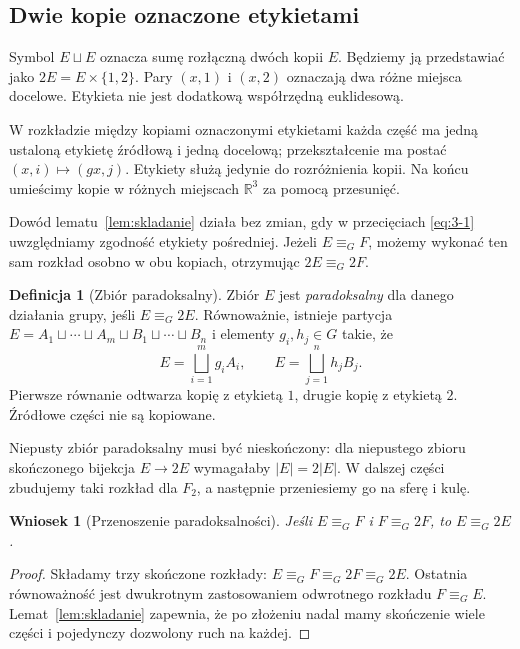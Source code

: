 \documentclass[11pt,a4paper]{article}
\numberwithin{equation}{section}
\theoremstyle{plain}
\newtheorem{wniosek}[twierdzenie]{Wniosek}
\theoremstyle{definition}
\newtheorem{definicja}[twierdzenie]{Definicja}
\theoremstyle{remark}
\newcommand{\R}{\mathbb R}
\newcommand{\equivG}{\mathrel{\equiv_G}}
\begin{document}
\subsection{Dwie kopie oznaczone etykietami}
Symbol $E\sqcup E$ oznacza sumę rozłączną dwóch kopii $E$. Będziemy ją przedstawiać jako $2E=E\times\{1,2\}$. Pary $(x,1)$ i $(x,2)$ oznaczają dwa różne miejsca docelowe. Etykieta nie jest dodatkową współrzędną euklidesową.

W rozkładzie między kopiami oznaczonymi etykietami każda część ma jedną ustaloną etykietę źródłową i jedną docelową; przekształcenie ma postać $(x,i)\mapsto(gx,j)$. Etykiety służą jedynie do rozróżnienia kopii. Na końcu umieścimy kopie w różnych miejscach $\R^3$ za pomocą przesunięć.

Dowód lematu~\ref{lem:skladanie} działa bez zmian, gdy w przecięciach \eqref{eq:3-1} uwzględniamy zgodność etykiety pośredniej. Jeżeli $E\equivG F$, możemy wykonać ten sam rozkład osobno w obu kopiach, otrzymując $2E\equivG2F$.
\begin{definicja}[Zbiór paradoksalny]\label{def:paradoksalny}
Zbiór $E$ jest \emph{paradoksalny} dla danego działania grupy, jeśli $E\equivG2E$. Równoważnie, istnieje partycja $E=A_1\sqcup\cdots\sqcup A_m\sqcup B_1\sqcup\cdots\sqcup B_n$ i elementy $g_i,h_j\in G$ takie, że
\[
 E=\bigsqcup_{i=1}^{m}g_iA_i,\qquad E=\bigsqcup_{j=1}^{n}h_jB_j.
\]
Pierwsze równanie odtwarza kopię z etykietą $1$, drugie kopię z etykietą $2$. Źródłowe części nie są kopiowane.
\end{definicja}
Niepusty zbiór paradoksalny musi być nieskończony: dla niepustego zbioru skończonego bijekcja $E\to2E$ wymagałaby $|E|=2|E|$. W dalszej części zbudujemy taki rozkład dla $F_2$, a następnie przeniesiemy go na sferę i kulę.
\begin{wniosek}[Przenoszenie paradoksalności]\label{wn:przenoszenie}
Jeśli $E\equivG F$ i $F\equivG2F$, to $E\equivG2E$.
\end{wniosek}
\begin{proof}
Składamy trzy skończone rozkłady: $E\equivG F\equivG2F\equivG2E$. Ostatnia równoważność jest dwukrotnym zastosowaniem odwrotnego rozkładu $F\equivG E$. Lemat~\ref{lem:skladanie} zapewnia, że po złożeniu nadal mamy skończenie wiele części i pojedynczy dozwolony ruch na każdej.
\end{proof}
\end{document}
